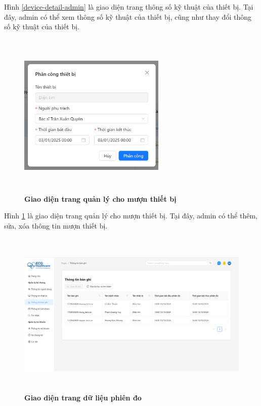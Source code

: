 Hình \ref{device-detail-admin} là giao diện trang thông số kỹ thuật của thiết bị. Tại đây, admin có thể xem thông số kỹ thuật của thiết bị, cũng như thay đổi thông số kỹ thuật của thiết bị.

\begin{figure}[H]
	\centering
	\includegraphics[width=7cm,height=8cm]{Images/admin_ui/assign.png}
	\caption[Giao diện trang quản lý cho mượn thiết bị]{\bfseries \fontsize{12pt}{0pt}\selectfont Giao diện trang quản lý cho mượn thiết bị}
	\label{assign-admin}
\end{figure}

Hình \ref{assign-admin} là giao diện trang quản lý cho mượn thiết bị. Tại đây, admin có thể thêm, sửa, xóa thông tin mượn thiết bị.

\begin{figure}[H]
	\centering
	\includegraphics[width=15cm,height=8cm]{Images/admin_ui/records.png}
	\caption[Giao diện trang dữ liệu phiên đo]{\bfseries \fontsize{12pt}{0pt}\selectfont Giao diện trang dữ liệu phiên đo}
	\label{records-admin}
\end{figure}

